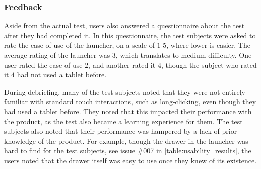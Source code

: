 \subsubsection{Feedback}
Aside from the actual test, users also answered a questionnaire about the test after they had completed it. 
In this questionnaire, the test subjects were asked to rate the ease of use of the launcher, on a scale of $1$-$5$, where lower is easier. 
The average rating of the launcher was $3$, which translates to medium difficulty. 
One user rated the ease of use $2$, and another rated it $4$, though the subject who rated it $4$ had not used a tablet before. \newline

During debriefing, many of the test subjects noted that they were not entirely familiar with standard touch interactions, such as long-clicking, even though they had used a tablet before. 
They noted that this impacted their performance with the product, as the test also became a learning experience for them. 
The test subjects also noted that their performance was hampered by a lack of prior knowledge of the product. 
For example, though the drawer in the \giraf[] launcher was hard to find for the test subjects, see issue \#{}007 in \autoref{table:usability_results}, the users noted that the drawer itself was easy to use once they knew of its existence. 